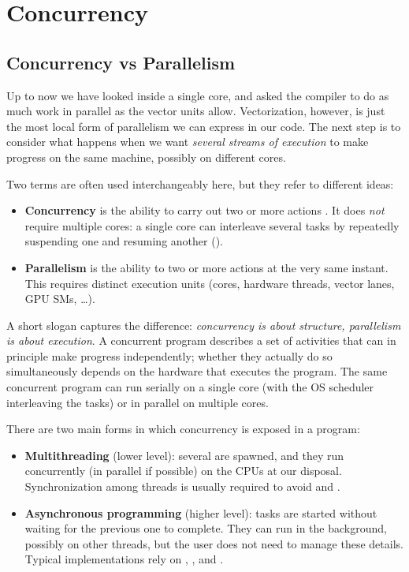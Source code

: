 \chapter{Concurrency}

\section{Concurrency vs Parallelism}

Up to now we have looked inside a single core, and asked the compiler to do as much work in parallel as the vector units allow. Vectorization, however, is just the most local form of parallelism we can express in our code. The next step is to consider what happens when we want \emph{several streams of execution} to make progress on the same machine, possibly on different cores.

Two terms are often used interchangeably here, but they refer to different ideas:

\begin{itemize}
    \item \textbf{Concurrency} is the ability to carry out two or more actions . It does \emph{not} require multiple cores: a single core can interleave several tasks by repeatedly suspending one and resuming another ().
    \item \textbf{Parallelism} is the ability to  two or more actions at the very same instant. This requires distinct execution units (cores, hardware threads, vector lanes, GPU SMs, \dots).
\end{itemize}

A short slogan captures the difference: \emph{concurrency is about structure, parallelism is about execution}. A concurrent program describes a set of activities that can in principle make progress independently; whether they actually do so simultaneously depends on the hardware that executes the program. The same concurrent program can run serially on a single core (with the OS scheduler interleaving the tasks) or in parallel on multiple cores.

There are two main forms in which concurrency is exposed in a program:

\begin{itemize}
    \item \textbf{Multithreading} (lower level): several  are spawned, and they run concurrently (in parallel if possible) on the CPUs at our disposal. Synchronization among threads is usually required to avoid  and .
    \item \textbf{Asynchronous programming} (higher level): tasks are started without waiting for the previous one to complete. They can run in the background, possibly on other threads, but the user does not need to manage these details. Typical implementations rely on , ,  and .
\end{itemize}

